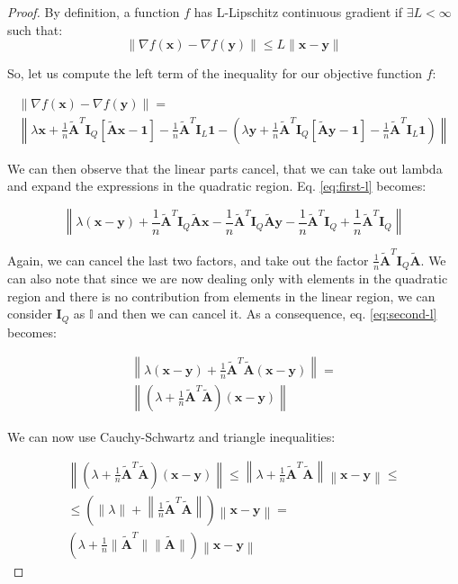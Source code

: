 \documentclass[12pt]{article}
\newcommand{\xb}{\mathbf{x}}
\newcommand{\yb}{\mathbf{y}}
\newcommand{\atilde}{\mathbf{\tilde{A}}}
\newcommand{\id}{\mathbf{I}}
\newcommand{\ones}{\mathbf{1}}
\newcommand{\fracn}{\frac{1}{n}}
\begin{document}
\begin{proof}
By definition, a function $f$ has L-Lipschitz continuous gradient if $\exists L < \infty$ such that:
\begin{equation} \label{eq:l-smooth}
    \lVert \nabla f(\xb) - \nabla f(\yb) \rVert \leq L \lVert \xb - \yb \rVert
\end{equation}

So, let us compute the left term of the inequality for our objective function $f$:

\begin{gather}
    \lVert \nabla f(\xb) - \nabla f(\yb) \rVert = \nonumber \\
    \left \lVert \lambda\xb + \fracn\atilde^T\id_Q[\atilde \xb - \ones] - \fracn\atilde^T\id_L\ones - \left ( \lambda\yb + \fracn\atilde^T\id_Q[\atilde \yb - \ones] - \fracn\atilde^T\id_L\ones \right ) \right \rVert \label{eq:first-l}
\end{gather}

We can then observe that the linear parts cancel, that we can take out lambda and expand the expressions in the quadratic region. Eq. \eqref{eq:first-l} becomes:

\begin{equation} \label{eq:second-l}
        \left \lVert \lambda (\xb - \yb) + \fracn\atilde^T\id_Q\atilde\xb - \fracn\atilde^T\id_Q\atilde\yb - \fracn\atilde^T\id_Q + \fracn\atilde^T\id_Q \right\rVert 
\end{equation}

Again, we can cancel the last two factors, and take out the factor $\fracn\atilde^T\id_Q\atilde$. We can also note that since we are now dealing only with elements in the quadratic region and there is no contribution from elements in the linear region, we can consider $\id_Q$ as $\mathbb{I}$ and then we can cancel it. As a consequence, eq. \eqref{eq:second-l} becomes:

\begin{gather}
    \left \lVert \lambda(\xb - \yb) + \fracn\atilde^T\atilde (\xb - \yb) \right \rVert = \nonumber \\
    \left \lVert \left ( \lambda + \fracn\atilde^T\atilde \right ) (\xb - \yb) \right \rVert \label{eq:third-l}
\end{gather}

We can now use Cauchy-Schwartz and triangle inequalities:

\begin{gather}
    \left \lVert \left ( \lambda + \fracn\atilde^T\atilde \right ) (\xb - \yb) \right \rVert \leq
    \left \lVert \lambda + \fracn\atilde^T\atilde \right \rVert \left \lVert \xb - \yb \right \rVert \leq \nonumber \\
    \leq \left ( \lVert \lambda \rVert + \left \lVert \fracn\atilde^T\atilde \right \rVert \right ) \left \lVert \xb - \yb \right \rVert = \nonumber \\
    \left (\lambda + \fracn \lVert \atilde^T \rVert \lVert \atilde \rVert  \right ) \left \lVert \xb - \yb \right \rVert \label{eq:fourth-l}
\end{gather}


\end{proof}
\end{document}
